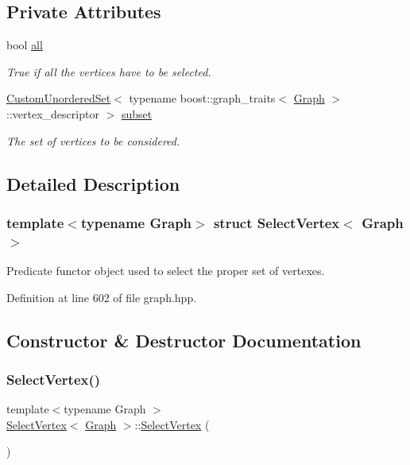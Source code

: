 \subsection*{Private Attributes}
\begin{DoxyCompactItemize}
\item 
bool \hyperlink{structSelectVertex_a93fdf1978ec2dfdeba3d4fe3bfc3d591}{all}
\begin{DoxyCompactList}\small\item\em True if all the vertices have to be selected. \end{DoxyCompactList}\item 
\hyperlink{classCustomUnorderedSet}{Custom\+Unordered\+Set}$<$ typename boost\+::graph\+\_\+traits$<$ \hyperlink{structGraph}{Graph} $>$\+::vertex\+\_\+descriptor $>$ \hyperlink{structSelectVertex_abc4802dbc58ee00968ecddeb0c1048a3}{subset}
\begin{DoxyCompactList}\small\item\em The set of vertices to be considered. \end{DoxyCompactList}\end{DoxyCompactItemize}


\subsection{Detailed Description}
\subsubsection*{template$<$typename Graph$>$\newline
struct Select\+Vertex$<$ Graph $>$}

Predicate functor object used to select the proper set of vertexes. 

Definition at line 602 of file graph.\+hpp.



\subsection{Constructor \& Destructor Documentation}
\mbox{\label{structSelectVertex_aa4047789904bf8a1648df60902c357bd}} 
\subsubsection{\texorpdfstring{Select\+Vertex()}{SelectVertex()}\hspace{0.1cm}{\footnotesize\ttfamily [1/2]}}
{\footnotesize\ttfamily template$<$typename Graph $>$ \\
\hyperlink{structSelectVertex}{Select\+Vertex}$<$ \hyperlink{structGraph}{Graph} $>$\+::\hyperlink{structSelectVertex}{Select\+Vertex} (\begin{DoxyParamCaption}{ }\end{DoxyParamCaption})\hspace{0.3cm}{\ttfamily [inline]}}



